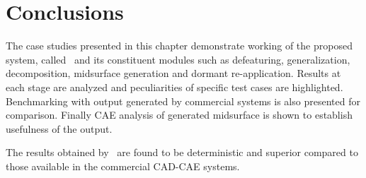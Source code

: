 
\section{Conclusions}

The case studies presented in this chapter demonstrate working of the proposed system, called \mysystemname~and its constituent modules such as defeaturing, generalization, decomposition,  midsurface generation and dormant re-application. Results at each stage are analyzed and peculiarities of specific test cases are highlighted. Benchmarking with output generated by commercial systems is also presented for comparison. Finally CAE analysis of generated midsurface is shown to establish usefulness of the output.

The results obtained by \mysystemname~are found to be deterministic and superior compared to those available in the commercial CAD-CAE systems.


